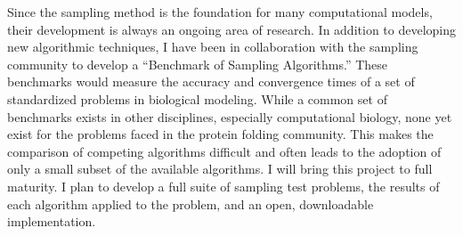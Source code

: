 \documentclass[]{scrartcl}
\begin{document}
\begin{cleanCV}
Since the sampling method is the foundation for many computational models, their development is always an ongoing area of research.
In addition to developing new algorithmic techniques, I have been in collaboration with the sampling community to develop a ``Benchmark of Sampling Algorithms.''
These benchmarks would measure the accuracy and convergence times of a set of standardized problems in biological modeling.
While a common set of benchmarks exists in other disciplines, especially computational biology, none yet exist for the problems faced in the protein folding community. 
This makes the comparison of competing algorithms difficult and often leads to the adoption of only a small subset of the available algorithms.
I will bring this project to full maturity.
I plan to develop a full suite of sampling test problems, the results of each algorithm applied to the problem, and an open, downloadable implementation.
\end{cleanCV}
\end{document}
